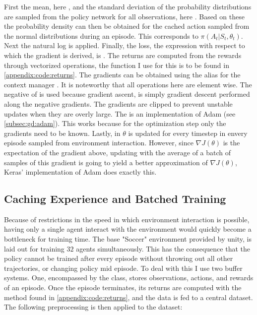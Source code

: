 First the mean, here , and the standard deviation of the probability distributions are sampled from the policy network for all observations, here . Based on these the probability density can then be obtained for the cached action sampled from the normal distributions during an episode. This corresponds to $\pi(A_t | S_t, \theta_t)$. Next the natural log is applied. Finally, the loss, the expression with respect to which the gradient is derived, is . The returns are computed from the rewards through vectorized operations, the function I use for this is to be found in \ref{appendix:code:returns}. The gradients  can be obtained using the alias for the context manager . It is noteworthy that all operations here are element wise. The negative of  is used because gradient ascent, is simply gradient descent performed along the negative gradients. The gradients are clipped to prevent unstable updates when they are overly large. The  is an implementation of Adam (see \ref{subsec:gd:adam}). This works because for the optimization step only the gradients need to be known. Lastly, in  $\theta$ is updated for every timestep in envery episode sampled from environment interaction. However, since $\nabla J(\theta)$ is the expectation of the gradient above, updating with the average of a batch of samples of this gradient is going to yield a better approximation of $\nabla J(\theta)$, Keras' implementation of Adam does exactly this. 

\subsection{Caching Experience and Batched Training}\label{subsec:ip:agent:archive}
Because of restrictions in the speed in which environment interaction is possible, having only a single agent interact with the environment would quickly become a bottleneck for training time. The base "Soccer" environment provided by unity, is laid out for training $32$ agents simultaneously. This has the consequence that the policy cannot be trained after every episode without throwing out all other trajectories, or changing policy mid episode. To deal with this I use two buffer systems. One, encompassed by the  class, stores observations, actions, and rewards of an episode. Once the episode terminates, its returns are computed with the method found in \ref{appendix:code:returns}, and the data is fed to a central dataset. The following preprocessing is then applied to the dataset:

